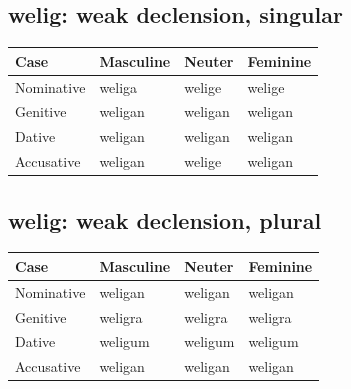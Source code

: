\subsection*{welig: weak declension, singular}

\par\begingroup
\fontsize{10.5}{13.2}\selectfont
\setlength{\LTleft}{0pt}\setlength{\LTright}{\fill}
\noindent
\begin{tabular}{@{}>{\raggedright\arraybackslash}p{28.89mm}>{\raggedright\arraybackslash}p{28.89mm}>{\raggedright\arraybackslash}p{28.89mm}>{\raggedright\arraybackslash}p{28.89mm}@{}}
\toprule
\textbf{Case} & \textbf{Masculine} & \textbf{Neuter} & \textbf{Feminine} \\
\midrule
Nominative & weliga & welige & welige \\
Genitive & weligan & weligan & weligan \\
Dative & weligan & weligan & weligan \\
Accusative & weligan & welige & weligan \\
\bottomrule
\end{tabular}
\par\endgroup

\subsection*{welig: weak declension, plural}

\par\begingroup
\fontsize{10.5}{13.2}\selectfont
\setlength{\LTleft}{0pt}\setlength{\LTright}{\fill}
\noindent
\begin{tabular}{@{}>{\raggedright\arraybackslash}p{28.89mm}>{\raggedright\arraybackslash}p{28.89mm}>{\raggedright\arraybackslash}p{28.89mm}>{\raggedright\arraybackslash}p{28.89mm}@{}}
\toprule
\textbf{Case} & \textbf{Masculine} & \textbf{Neuter} & \textbf{Feminine} \\
\midrule
Nominative & weligan & weligan & weligan \\
Genitive & weligra & weligra & weligra \\
Dative & weligum & weligum & weligum \\
Accusative & weligan & weligan & weligan \\
\bottomrule
\end{tabular}
\par\endgroup

